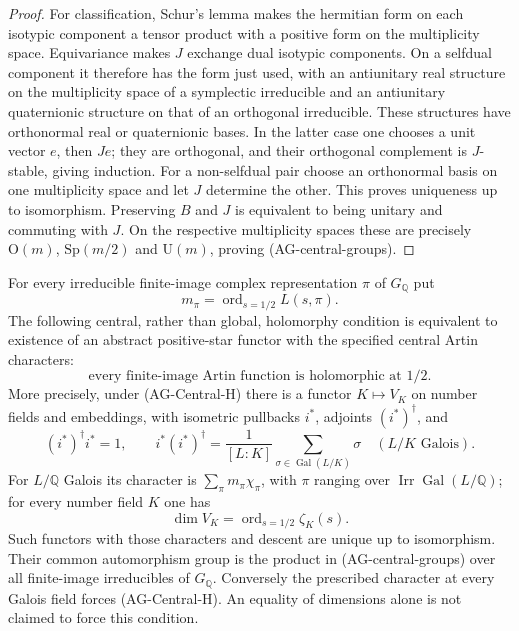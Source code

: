 \begin{proof}
For classification, Schur's lemma makes the hermitian form on
each isotypic component a tensor product with a positive form
on the multiplicity space.  Equivariance makes $J$ exchange
dual isotypic components.  On a selfdual component it therefore
has the form just used, with an antiunitary real structure on
the multiplicity space of a symplectic irreducible and an
antiunitary quaternionic structure on that of an orthogonal
irreducible.  These structures have orthonormal real or
quaternionic bases.  In the latter case one chooses a unit
vector $e$, then $Je$; they are orthogonal, and their
orthogonal complement is $J$-stable, giving induction.
For a non-selfdual pair choose an orthonormal basis on one
multiplicity space and let $J$ determine the other.
This proves uniqueness up to isomorphism.
Preserving $B$ and $J$ is equivalent to being unitary and
commuting with $J$.  On the respective multiplicity spaces
these are precisely $\mathrm O(m)$, $\mathrm{Sp}(m/2)$ and
$\mathrm U(m)$, proving (AG-central-groups).
\end{proof}

\begin{proposition}
For every irreducible finite-image complex representation $\pi$
of $G_{\mathbb Q}$ put
\[
             m_\pi=\operatorname{ord}_{s=1/2}L(s,\pi).
\]
The following central, rather than global, holomorphy condition
is equivalent to existence of an abstract positive-star functor
with the specified central Artin characters:
\[
 \text{every finite-image Artin function is holomorphic at }1/2.
                                                        \tag{AG-Central-H}
\]
More precisely, under (AG-Central-H) there is a functor $K\mapsto V_K$
on number fields and embeddings, with isometric pullbacks $i^*$,
adjoints $(i^*)^\dagger$, and
\[
 (i^*)^\dagger i^*=1,\qquad
 i^*(i^*)^\dagger=\frac1{[L:K]}
                 \sum_{\sigma\in\operatorname{Gal}(L/K)}\sigma
 \quad(L/K\text{ Galois}).                              \tag{AG-central-descent}
\]
For $L/\mathbb Q$ Galois its character is
$\sum_\pi m_\pi\chi_\pi$, with $\pi$ ranging over
$\operatorname{Irr}\operatorname{Gal}(L/\mathbb Q)$; for every
number field $K$ one has
\[
             \dim V_K=\operatorname{ord}_{s=1/2}\zeta_K(s).
                                                        \tag{AG-central-dimension}
\]
Such functors with those characters and descent are unique up
to isomorphism.  Their common automorphism group is the product
in (AG-central-groups) over all finite-image irreducibles of
$G_{\mathbb Q}$.  Conversely the prescribed character at every
Galois field forces (AG-Central-H).  An equality of dimensions
alone is not claimed to force this condition.
\end{proposition}

